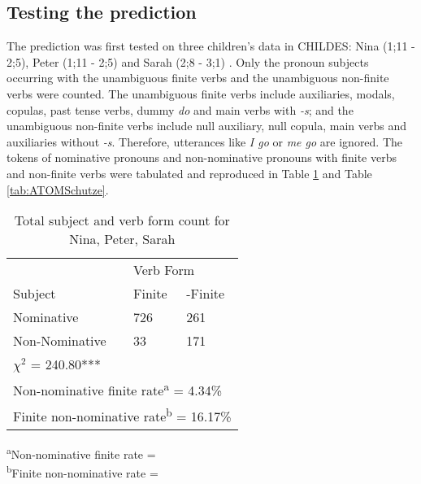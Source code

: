 \subsection{Testing the prediction}
The prediction was first tested on three children's data in CHILDES: Nina (1;11 - 2;5), Peter (1;11 - 2;5) and Sarah (2;8 - 3;1) \citep{schutze1996subject,schutze1997}. Only the pronoun subjects occurring with the unambiguous finite verbs and the unambiguous non-finite verbs were counted. The unambiguous finite verbs include auxiliaries, modals, copulas, past tense verbs, dummy \textit{do} and main verbs with \textit{-s}; and the unambiguous non-finite verbs include null auxiliary, null copula, main verbs and auxiliaries without \textit{-s}. Therefore, utterances like \textit{I go} or \textit{me go} are ignored. 
The tokens of nominative pronouns and non-nominative pronouns with finite verbs and non-finite verbs were tabulated and reproduced in Table \ref{table:schutzetotal} and Table \ref{tab:ATOMSchutze}. 
\FloatBarrier
\begin{table}[!h]
\centering
\caption{Total subject and verb form count for Nina, Peter, Sarah}
\label{table:schutzetotal}
\begin{tabular}{lll}
\toprule
 & \multicolumn{2}{l}{Verb Form} \\ \cline{2-3} 
Subject & Finite & -Finite \\ \hline
Nominative & 726 & 261 \\
Non-Nominative & 33 & 171\\
\hline
 \multicolumn{3}{l}{$\chi^2$ = 240.80***}\\
 \multicolumn{3}{l}{Non-nominative finite rate\textsuperscript{a} = 4.34\%} \\
\multicolumn{3}{l}{Finite non-nominative rate\textsuperscript{b} = 16.17\%}\\
\bottomrule
\end{tabular}
\end{table}
\FloatBarrier
{\centering
\textsuperscript{a}Non-nominative finite rate = \displaystyle{}\\
\textsuperscript{b}Finite non-nominative rate = \displaystyle{}
\par}

